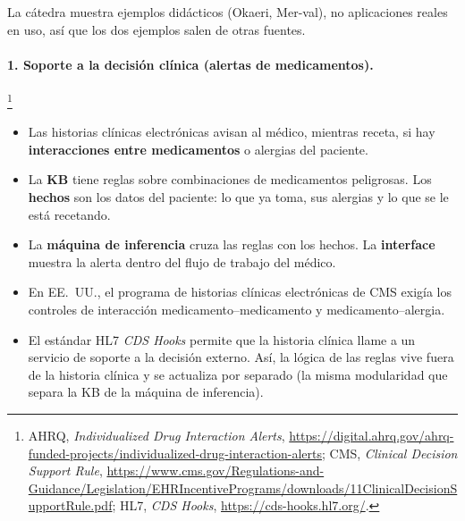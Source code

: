 \documentclass[11pt,a4paper]{article}
\newcommand{\fuentesweb}[1]{\footnote{\raggedright #1.}}
\begin{document}
La cátedra muestra ejemplos didácticos (Okaeri, Mer-val), no aplicaciones reales en uso, así que los dos ejemplos salen de otras fuentes.

\paragraph{1. Soporte a la decisión clínica (alertas de medicamentos).}\fuentesweb{AHRQ, \textit{Individualized Drug Interaction Alerts}, \url{https://digital.ahrq.gov/ahrq-funded-projects/individualized-drug-interaction-alerts}; CMS, \textit{Clinical Decision Support Rule}, \url{https://www.cms.gov/Regulations-and-Guidance/Legislation/EHRIncentivePrograms/downloads/11ClinicalDecisionSupportRule.pdf}; HL7, \textit{CDS Hooks}, \url{https://cds-hooks.hl7.org/}}
\begin{itemize}
  \item Las historias clínicas electrónicas avisan al médico, mientras receta, si hay \textbf{interacciones entre medicamentos} o alergias del paciente.
  \item La \textbf{KB} tiene reglas sobre combinaciones de medicamentos peligrosas. Los \textbf{hechos} son los datos del paciente: lo que ya toma, sus alergias y lo que se le está recetando.
  \item La \textbf{máquina de inferencia} cruza las reglas con los hechos. La \textbf{interface} muestra la alerta dentro del flujo de trabajo del médico.
  \item En EE.~UU., el programa de historias clínicas electrónicas de CMS exigía los controles de interacción medicamento--medicamento y medicamento--alergia.
  \item El estándar HL7 \textit{CDS Hooks} permite que la historia clínica llame a un servicio de soporte a la decisión externo. Así, la lógica de las reglas vive fuera de la historia clínica y se actualiza por separado (la misma modularidad que separa la KB de la máquina de inferencia).
\end{itemize}
\end{document}
